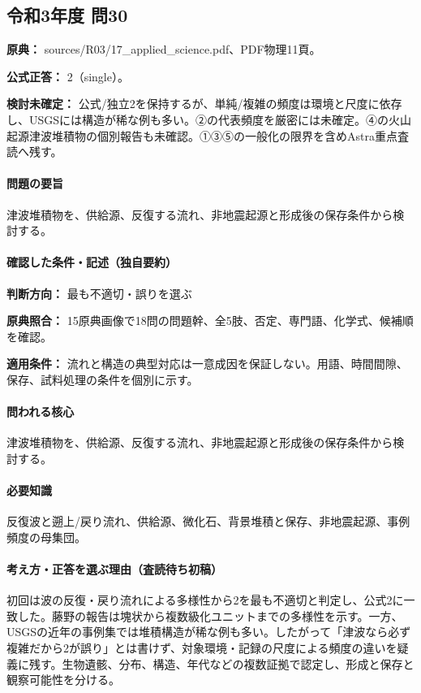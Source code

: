 \subsection{令和3年度 問30}
\label{q:r03-reg-applied-30}

\noindent\textbf{原典：} sources/R03/17\_applied\_science.pdf、PDF物理11頁。

\textbf{公式正答：} 2（single）。

\par\textbf{検討未確定：} 公式/独立2を保持するが、単純/複雑の頻度は環境と尺度に依存し、USGSには構造が稀な例も多い。②の代表頻度を厳密には未確定。④の火山起源津波堆積物の個別報告も未確認。①③⑤の一般化の限界を含めAstra重点査読へ残す。

\paragraph{問題の要旨} 津波堆積物を、供給源、反復する流れ、非地震起源と形成後の保存条件から検討する。

\paragraph{確認した条件・記述（独自要約）}\mbox{}\par

\noindent\textbf{判断方向：} 最も不適切・誤りを選ぶ\par

\noindent\textbf{原典照合：} 15原典画像で18問の問題幹、全5肢、否定、専門語、化学式、候補順を確認。\par

\noindent\textbf{適用条件：} 流れと構造の典型対応は一意成因を保証しない。用語、時間間隙、保存、試料処理の条件を個別に示す。\par

\paragraph{問われる核心} 津波堆積物を、供給源、反復する流れ、非地震起源と形成後の保存条件から検討する。

\paragraph{必要知識} 反復波と遡上/戻り流れ、供給源、微化石、背景堆積と保存、非地震起源、事例頻度の母集団。

\paragraph{考え方・正答を選ぶ理由（査読待ち初稿）} 初回は波の反復・戻り流れによる多様性から2を最も不適切と判定し、公式2に一致した。藤野の報告は塊状から複数級化ユニットまでの多様性を示す。一方、USGSの近年の事例集では堆積構造が稀な例も多い。したがって「津波なら必ず複雑だから2が誤り」とは書けず、対象環境・記録の尺度による頻度の違いを疑義に残す。生物遺骸、分布、構造、年代などの複数証拠で認定し、形成と保存と観察可能性を分ける。

